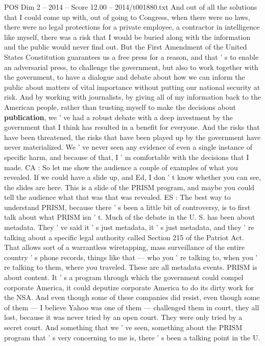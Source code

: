 \begin{textsample}{POS Dim 2 – 2014 – Score 12.00 – 2014/t001880.txt}
And out of all the solutions that I could come up with, out of going to Congress, when there were no laws, there were no legal protections for a private employee, a contractor in intelligence like myself, there was a risk that I would be buried along with the information and the public would never find out.
But the First Amendment of the United States Constitution guarantees us a free press for a reason, and that ' s to enable an adversarial press, to challenge the government, but also to work together with the government, to have a dialogue and debate about how we can inform the public about matters of vital importance without putting our national security at risk.
And by working with journalists, by giving all of my information back to the American people, rather than trusting myself to make the decisions about \textbf{publication}, we ' ve had a robust debate with a deep investment by the government that I think has resulted in a benefit for everyone.
And the risks that have been threatened, the risks that have been played up by the government have never materialized.
We ' ve never seen any evidence of even a single instance of specific harm, and because of that, I ' m comfortable with the decisions that I made.
CA : So let me show the audience a couple of examples of what you revealed.
If we could have a slide up, and Ed, I don ' t know whether you can see, the slides are here.
This is a slide of the PRISM program, and maybe you could tell the audience what that was that was revealed.
ES : The best way to understand PRISM, because there ' s been a little bit of controversy, is to first talk about what PRISM isn ' t.
Much of the debate in the U.
S. has been about metadata.
They ' ve said it ' s just metadata, it ' s just metadata, and they ' re talking about a specific legal authority called Section 215 of the Patriot Act.
That allows sort of a warrantless wiretapping, mass surveillance of the entire country ' s phone records, things like that — who you ' re talking to, when you ' re talking to them, where you traveled.
These are all metadata events.
PRISM is about content.
It ' s a program through which the government could compel corporate America, it could deputize corporate America to do its dirty work for the NSA.
And even though some of these companies did resist, even though some of them — I believe Yahoo was one of them — challenged them in court, they all lost, because it was never tried by an open court.
They were only tried by a secret court.
And something that we ' ve seen, something about the PRISM program that ' s very concerning to me is, there ' s been a talking point in the U.

\end{textsample}
